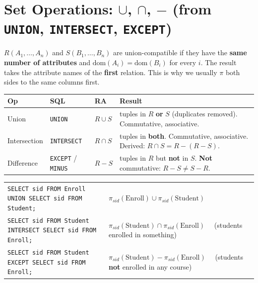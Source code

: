 \documentclass[10pt,a4paper]{article}
\newcommand{\R}[1]{\mathrm{#1}}          %
\begin{document}
\section{Set Operations: $\cup$, $\cap$, $-$ (from \texttt{UNION}, \texttt{INTERSECT}, \texttt{EXCEPT})}

\begin{keybox}
$R(A_1,\dots,A_n)$ and $S(B_1,\dots,B_n)$ are union-compatible if they have the \textbf{same number of attributes} and $\mathrm{dom}(A_i) = \mathrm{dom}(B_i)$ for every $i$. The result takes the attribute names of the \textbf{first} relation. This is why we usually $\pi$ both sides to the same columns first.
\end{keybox}

\begin{tabularx}{\linewidth}{@{}l l l X@{}}
\toprule
\textbf{Op} & \textbf{SQL} & \textbf{RA} & \textbf{Result}\\\midrule
Union & \texttt{UNION} & $R \cup S$ & tuples in $R$ \textbf{or} $S$ (duplicates removed). Commutative, associative.\\
Intersection & \texttt{INTERSECT} & $R \cap S$ & tuples in \textbf{both}. Commutative, associative. Derived: $R \cap S = R - (R - S)$.\\
Difference & \texttt{EXCEPT} / \texttt{MINUS} & $R - S$ & tuples in $R$ but \textbf{not} in $S$. \textbf{Not} commutative: $R - S \neq S - R$.\\
\bottomrule
\end{tabularx}

\begin{exbox}
\begin{tabularx}{\linewidth}{@{}X X@{}}
\texttt{SELECT sid FROM Enroll UNION SELECT sid FROM Student;} & $\pi_{sid}(\R{Enroll}) \cup \pi_{sid}(\R{Student})$\\
\texttt{SELECT sid FROM Student INTERSECT SELECT sid FROM Enroll;} & $\pi_{sid}(\R{Student}) \cap \pi_{sid}(\R{Enroll})$ \ \ (students enrolled in something)\\
\texttt{SELECT sid FROM Student EXCEPT SELECT sid FROM Enroll;} & $\pi_{sid}(\R{Student}) - \pi_{sid}(\R{Enroll})$ \ \ (students \textbf{not} enrolled in any course)\\
\end{tabularx}
\end{exbox}
\end{document}
